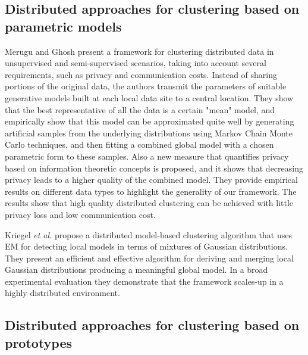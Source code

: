 \documentclass[smallextended]{svjour3}       %
\begin{document}

\subsection{Distributed approaches for clustering based on parametric models}

Merugu and Ghosh \cite{MG03} present a framework for clustering distributed data in unsupervised and semi-supervised scenarios, taking into account several requirements, such as privacy and communication costs. Instead of sharing portions of the original data, the authors transmit the parameters of suitable generative models built at each local data site to a central location. They show that the best representative of all the data is a certain "mean" model, and empirically show that this model can be approximated quite well by generating artificial samples from the underlying distributions using Markov Chain Monte Carlo techniques, and then fitting a combined global model with a chosen parametric form to these samples. Also a new measure that quantifies privacy based on information theoretic concepts is proposed, and it shows that decreasing privacy leads to a higher quality of the combined model. They provide empirical results on different data types to highlight the generality of our framework. The results show that high quality distributed clustering can be achieved with little privacy loss and low communication cost.

Kriegel \textit{et al.} \cite{KKPS05} propose a distributed model-based clustering algorithm that uses EM for detecting local models in terms of mixtures of Gaussian distributions. They present an efficient and effective algorithm for de\-ri\-ving and merging  local Gaussian distributions producing a meaningful global model. In a broad experimental evaluation they demonstrate that the framework scales-up in a highly distributed environment.

\subsection{Distributed approaches for clustering based on prototypes}
\end{document}
